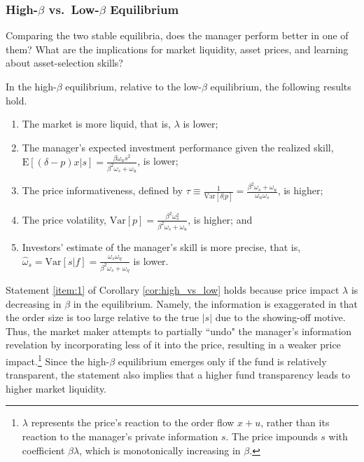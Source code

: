 \subsubsection{High-\texorpdfstring{$\beta$}{beta} vs.\ Low-\texorpdfstring{$\beta$}{beta} Equilibrium}\label{sss:high_vs_low}
Comparing the two stable equilibria, does the manager perform better in one of them? What are the implications for market liquidity, asset prices, and learning about asset-selection skills?
\begin{corollary}\label{cor:high_vs_low}
In the high-$\beta$ equilibrium, relative to the low-$\beta$ equilibrium, the following results hold.
\begin{enumerate}[label=(\roman*)]
\item \label{item:1} The market is more liquid, that is, $\lambda$ is lower;
\item \label{item:2} The manager's expected investment performance given the realized skill, $\mathrm{E}[(\delta-p)x|s]=\frac{\beta\omega_{u}s^{2}}{\beta^{2} \omega_{s}+\omega_{u}}$, is lower;
\item \label{item:3} The price informativeness, defined by $\tau\equiv\frac{1}{\mathrm{Var}[\delta|p]}=\frac{\beta^{2} \omega_{s}+\omega_{u}}{\omega_{u} \omega_{s}}$, is higher;
\item \label{item:4} The price volatility, $\mathrm{Var}[p]=\frac{\beta^{2}\omega_{s}^{2}}{\beta^{2} \omega_{s}+\omega_{u}}$, is higher; and
\item \label{item:5} Investors' estimate of the manager's skill is more precise, that is, $\hat{\omega}_{s}=\mathrm{Var}[s|f] = \frac{\omega_{s}\omega_{\eta}}{\beta^{2}\omega_{s}+\omega_{\eta}}$ is lower.
\end{enumerate}
\end{corollary}

Statement \ref{item:1} of Corollary \ref{cor:high_vs_low} holds because price impact $\lambda$ is decreasing in $\beta$ in the equilibrium. Namely, the information is exaggerated in that the order size is too large relative to the true $|s|$ due to the showing-off motive. Thus, the market maker attempts to partially ``undo" the manager's information revelation by incorporating less of it into the price, resulting in a weaker price impact.\footnote{$\lambda$ represents the price's reaction to the order flow $x+u$, rather than its reaction to the manager's private information $s$. The price impounds $s$ with coefficient $\beta\lambda$, which is monotonically increasing in $\beta$.} Since the high-$\beta$ equilibrium emerges only if the fund is relatively transparent, the statement also implies that a higher fund transparency leads to higher market liquidity.

